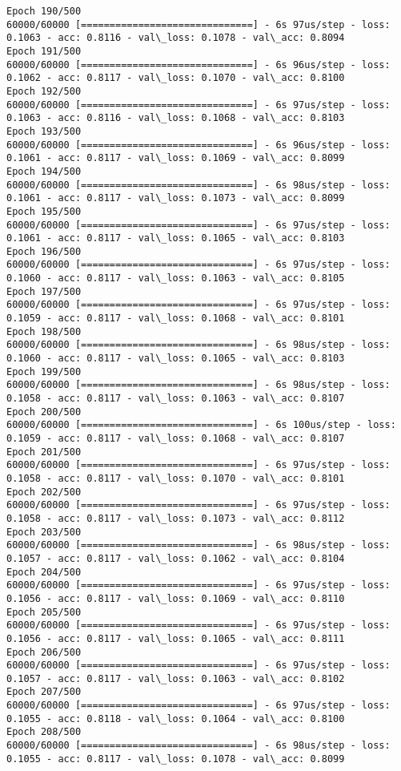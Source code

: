 \documentclass[11pt]{article}
\begin{document}
\begin{Verbatim}[commandchars=\\\{\}]
Epoch 190/500
60000/60000 [==============================] - 6s 97us/step - loss: 0.1063 - acc: 0.8116 - val\_loss: 0.1078 - val\_acc: 0.8094
Epoch 191/500
60000/60000 [==============================] - 6s 96us/step - loss: 0.1062 - acc: 0.8117 - val\_loss: 0.1070 - val\_acc: 0.8100
Epoch 192/500
60000/60000 [==============================] - 6s 97us/step - loss: 0.1063 - acc: 0.8116 - val\_loss: 0.1068 - val\_acc: 0.8103
Epoch 193/500
60000/60000 [==============================] - 6s 96us/step - loss: 0.1061 - acc: 0.8117 - val\_loss: 0.1069 - val\_acc: 0.8099
Epoch 194/500
60000/60000 [==============================] - 6s 98us/step - loss: 0.1061 - acc: 0.8117 - val\_loss: 0.1073 - val\_acc: 0.8099
Epoch 195/500
60000/60000 [==============================] - 6s 97us/step - loss: 0.1061 - acc: 0.8117 - val\_loss: 0.1065 - val\_acc: 0.8103
Epoch 196/500
60000/60000 [==============================] - 6s 97us/step - loss: 0.1060 - acc: 0.8117 - val\_loss: 0.1063 - val\_acc: 0.8105
Epoch 197/500
60000/60000 [==============================] - 6s 97us/step - loss: 0.1059 - acc: 0.8117 - val\_loss: 0.1068 - val\_acc: 0.8101
Epoch 198/500
60000/60000 [==============================] - 6s 98us/step - loss: 0.1060 - acc: 0.8117 - val\_loss: 0.1065 - val\_acc: 0.8103
Epoch 199/500
60000/60000 [==============================] - 6s 98us/step - loss: 0.1058 - acc: 0.8117 - val\_loss: 0.1063 - val\_acc: 0.8107
Epoch 200/500
60000/60000 [==============================] - 6s 100us/step - loss: 0.1059 - acc: 0.8117 - val\_loss: 0.1068 - val\_acc: 0.8107
Epoch 201/500
60000/60000 [==============================] - 6s 97us/step - loss: 0.1058 - acc: 0.8117 - val\_loss: 0.1070 - val\_acc: 0.8101
Epoch 202/500
60000/60000 [==============================] - 6s 97us/step - loss: 0.1058 - acc: 0.8117 - val\_loss: 0.1073 - val\_acc: 0.8112
Epoch 203/500
60000/60000 [==============================] - 6s 98us/step - loss: 0.1057 - acc: 0.8117 - val\_loss: 0.1062 - val\_acc: 0.8104
Epoch 204/500
60000/60000 [==============================] - 6s 97us/step - loss: 0.1056 - acc: 0.8117 - val\_loss: 0.1069 - val\_acc: 0.8110
Epoch 205/500
60000/60000 [==============================] - 6s 97us/step - loss: 0.1056 - acc: 0.8117 - val\_loss: 0.1065 - val\_acc: 0.8111
Epoch 206/500
60000/60000 [==============================] - 6s 97us/step - loss: 0.1057 - acc: 0.8117 - val\_loss: 0.1063 - val\_acc: 0.8102
Epoch 207/500
60000/60000 [==============================] - 6s 97us/step - loss: 0.1055 - acc: 0.8118 - val\_loss: 0.1064 - val\_acc: 0.8100
Epoch 208/500
60000/60000 [==============================] - 6s 98us/step - loss: 0.1055 - acc: 0.8117 - val\_loss: 0.1078 - val\_acc: 0.8099

\end{Verbatim}
\end{document}
